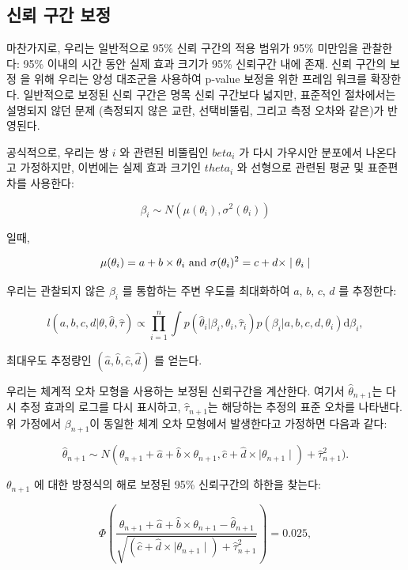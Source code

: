 \documentclass[10.5pt]{book}
\theoremstyle{definition}
\theoremstyle{definition}
\theoremstyle{definition}
\theoremstyle{remark}
\begin{document}
\subsection{신뢰 구간 보정}\label{--}


마찬가지로, 우리는 일반적으로 95\% 신뢰 구간의 적용 범위가 95\% 미만임을
관찰한다: 95\% 이내의 시간 동안 실제 효과 크기가 95\% 신뢰구간 내에
존재. 신뢰 구간의 보정 \citep{schuemie_2018} 을 위해 우리는 양성
대조군을 사용하여 p-value 보정을 위한 프레임 워크를 확장한다. 일반적으로
보정된 신뢰 구간은 명목 신뢰 구간보다 넓지만, 표준적인 절차에서는
설명되지 않던 문제 (측정되지 않은 교란, 선택비뚤림, 그리고 측정 오차와
같은)가 반영된다.

공식적으로, 우리는 쌍 \(i\) 와 관련된 비뚤림인 \(beta_i\) 가 다시
가우시안 분포에서 나온다고 가정하지만, 이번에는 실제 효과 크기인
\(theta_i\) 와 선형으로 관련된 평균 및 표준편차를 사용한다:

\[\beta_i \sim N(\mu(\theta_i) , \sigma^2(\theta_i))\]

일때,

\[\mu(\theta_i) = a + b \times \theta_i \text{ and } \\
  \sigma(\theta_i) ^2= c + d \times \mid \theta_i \mid\]

우리는 관찰되지 않은 \(\beta_i\) 를 통합하는 주변 우도를 최대화하여
\(a\), \(b\), \(c\), \(d\) 를 추정한다:

\[l(a,b,c,d | \theta, \hat{\theta}, \hat{\tau} ) \propto \prod_{i=1}^{n}\int p(\hat{\theta}_i|\beta_i, \theta_i, \hat{\tau}_i)p(\beta_i|a,b,c,d,\theta_i) \text{d}\beta_i ,\]

최대우도 추정량인 \((\hat{a}, \hat{b}, \hat{c}, \hat{d})\) 를 얻는다.

우리는 체계적 오차 모형을 사용하는 보정된 신뢰구간을 계산한다. 여기서
\(\hat{\theta}_{n+1}\)는 다시 추정 효과의 로그를 다시 표시하고,
\(\hat{\tau}_{n+1}\)는 해당하는 추정의 표준 오차를 나타낸다. 위 가정에서
\(\beta_{n+1}\)이 동일한 체계 오차 모형에서 발생한다고 가정하면 다음과
같다:

\[\hat{\theta}_{n+1} \sim N(
\theta_{n+1} + \hat{a} + \hat{b} \times \theta_{n+1},
\hat{c} + \hat{d} \times \mid \theta_{n+1} \mid) + \hat{\tau}_{n+1}^2) .\]

\(\theta_{n+1}\) 에 대한 방정식의 해로 보정된 95\% 신뢰구간의 하한을
찾는다:

\[\Phi\left(
\frac{\theta_{n+1} + \hat{a} + \hat{b} \times \theta_{n+1}-\hat{\theta}_{n+1}}
{\sqrt{(\hat{c} + \hat{d} \times \mid \theta_{n+1} \mid) + \hat{\tau}_{n+1}^2}}
\right) = 0.025 ,\]
\end{document}
